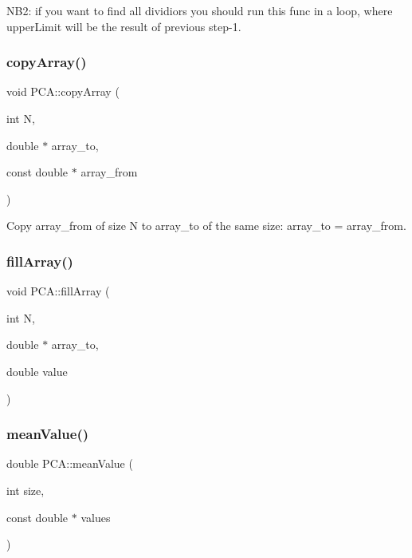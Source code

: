 N\+B2\+: if you want to find all dividiors you should run this func in a loop, where upper\+Limit will be the result of previous step-\/1. \hypertarget{namespace_p_c_a_ac0ca09771710ce44c06d3f5f4402fd80}{}\label{namespace_p_c_a_ac0ca09771710ce44c06d3f5f4402fd80} 
\subsubsection{\texorpdfstring{copy\+Array()}{copyArray()}}
{\footnotesize\ttfamily void P\+C\+A\+::copy\+Array (\begin{DoxyParamCaption}\item[{int}]{N,  }\item[{double $\ast$}]{array\+\_\+to,  }\item[{const double $\ast$}]{array\+\_\+from }\end{DoxyParamCaption})}



Copy array\+\_\+from of size N to array\+\_\+to of the same size\+: array\+\_\+to = array\+\_\+from. 

\hypertarget{namespace_p_c_a_af4a7844595578d2c8e09635fba6db3b2}{}\label{namespace_p_c_a_af4a7844595578d2c8e09635fba6db3b2} 
\subsubsection{\texorpdfstring{fill\+Array()}{fillArray()}}
{\footnotesize\ttfamily void P\+C\+A\+::fill\+Array (\begin{DoxyParamCaption}\item[{int}]{N,  }\item[{double $\ast$}]{array\+\_\+to,  }\item[{double}]{value }\end{DoxyParamCaption})}

\hypertarget{namespace_p_c_a_a330e0aee67470237e1e755eb5b151d6c}{}\label{namespace_p_c_a_a330e0aee67470237e1e755eb5b151d6c} 
\subsubsection{\texorpdfstring{mean\+Value()}{meanValue()}}
{\footnotesize\ttfamily double P\+C\+A\+::mean\+Value (\begin{DoxyParamCaption}\item[{int}]{size,  }\item[{const double $\ast$}]{values }\end{DoxyParamCaption})}


